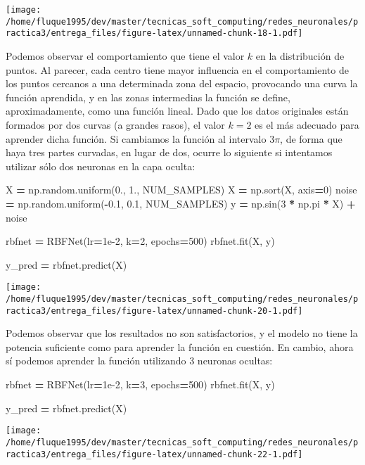 \documentclass[
  a4paper,
,tablecaptionabove
]{scrartcl}
\newenvironment{Shaded}{\begin{snugshade}}{\end{snugshade}}
\newcommand{\DecValTok}[1]{\textcolor[rgb]{0.00,0.00,0.81}{#1}}
\newcommand{\FloatTok}[1]{\textcolor[rgb]{0.00,0.00,0.81}{#1}}
\newcommand{\NormalTok}[1]{#1}
\newcommand{\OperatorTok}[1]{\textcolor[rgb]{0.81,0.36,0.00}{\textbf{#1}}}
\begin{document}
\texttt{[image: /home/fluque1995/dev/master/tecnicas\_soft\_computing/redes\_neuronales/practica3/entrega\_files/figure-latex/unnamed-chunk-18-1.pdf]}

Podemos observar el comportamiento que tiene el valor \(k\) en la
distribución de puntos. Al parecer, cada centro tiene mayor influencia
en el comportamiento de los puntos cercanos a una determinada zona del
espacio, provocando una curva la función aprendida, y en las zonas
intermedias la función se define, aproximadamente, como una función
lineal. Dado que los datos originales están formados por dos curvas (a
grandes rasos), el valor \(k = 2\) es el más adecuado para aprender
dicha función. Si cambiamos la función al intervalo \(3 \pi\), de forma
que haya tres partes curvadas, en lugar de dos, ocurre lo siguiente si
intentamos utilizar sólo dos neuronas en la capa oculta:

\begin{Shaded}
\begin{Highlighting}[]
\NormalTok{X }\OperatorTok{=}\NormalTok{ np.random.uniform(}\FloatTok{0.}\NormalTok{, }\FloatTok{1.}\NormalTok{, NUM_SAMPLES)}
\NormalTok{X }\OperatorTok{=}\NormalTok{ np.sort(X, axis}\OperatorTok{=}\DecValTok{0}\NormalTok{)}
\NormalTok{noise }\OperatorTok{=}\NormalTok{ np.random.uniform(}\OperatorTok{-}\FloatTok{0.1}\NormalTok{, }\FloatTok{0.1}\NormalTok{, NUM_SAMPLES)}
\NormalTok{y }\OperatorTok{=}\NormalTok{ np.sin(}\DecValTok{3} \OperatorTok{*}\NormalTok{ np.pi }\OperatorTok{*}\NormalTok{ X) }\OperatorTok{+}\NormalTok{ noise}

\NormalTok{rbfnet }\OperatorTok{=}\NormalTok{ RBFNet(lr}\OperatorTok{=}\FloatTok{1e-2}\NormalTok{, k}\OperatorTok{=}\DecValTok{2}\NormalTok{, epochs}\OperatorTok{=}\DecValTok{500}\NormalTok{)}
\NormalTok{rbfnet.fit(X, y)}

\NormalTok{y_pred }\OperatorTok{=}\NormalTok{ rbfnet.predict(X)}
\end{Highlighting}
\end{Shaded}

\texttt{[image: /home/fluque1995/dev/master/tecnicas\_soft\_computing/redes\_neuronales/practica3/entrega\_files/figure-latex/unnamed-chunk-20-1.pdf]}

Podemos observar que los resultados no son satisfactorios, y el modelo
no tiene la potencia suficiente como para aprender la función en
cuestión. En cambio, ahora sí podemos aprender la función utilizando 3
neuronas ocultas:

\begin{Shaded}
\begin{Highlighting}[]
\NormalTok{rbfnet }\OperatorTok{=}\NormalTok{ RBFNet(lr}\OperatorTok{=}\FloatTok{1e-2}\NormalTok{, k}\OperatorTok{=}\DecValTok{3}\NormalTok{, epochs}\OperatorTok{=}\DecValTok{500}\NormalTok{)}
\NormalTok{rbfnet.fit(X, y)}

\NormalTok{y_pred }\OperatorTok{=}\NormalTok{ rbfnet.predict(X)}
\end{Highlighting}
\end{Shaded}

\texttt{[image: /home/fluque1995/dev/master/tecnicas\_soft\_computing/redes\_neuronales/practica3/entrega\_files/figure-latex/unnamed-chunk-22-1.pdf]}
\end{document}
